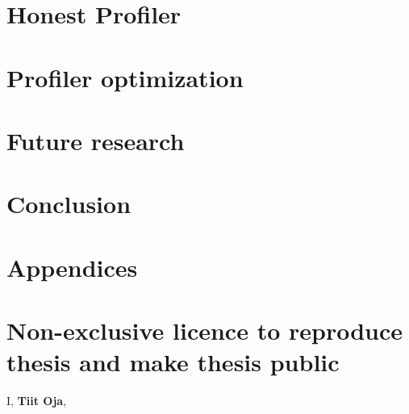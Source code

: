 \documentclass{style/thesis}
\begin{document}
\pagebreak


\section{Honest Profiler}
\label{sec:honest-profiler}


\pagebreak
\section{Profiler optimization}
\label{sec:optimization}


\pagebreak
\section{Future research}
\label{sec:future-research}


\clearpage
\section{Conclusion} 



\newpage

\def\urlprefix{}
\nocite{*}
{}



\newpage

\appendix
\section*{Appendices}
\renewcommand{\thesubsection}{\Alph{subsection}}

\pagebreak
\section*{Non-exclusive licence to reproduce thesis and make thesis public}

\renewcommand{\labelenumii}{\theenumii}
\renewcommand{\theenumii}{\theenumi.\arabic{enumii}.}

I, \textbf{Tiit Oja},
\end{document}
